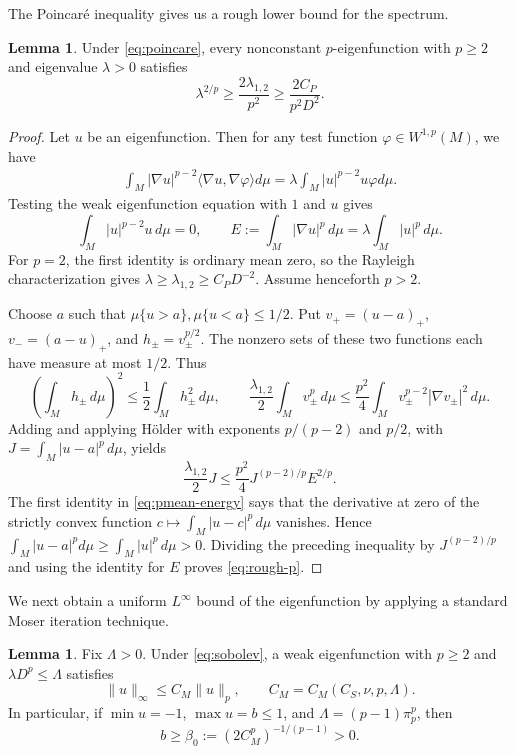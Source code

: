 \documentclass[11pt]{amsart}
\theoremstyle{definition}
\newtheorem{lemma}[theorem]{Lemma}
\begin{document}
The Poincar\'e inequality gives us a rough lower bound for the spectrum.
\begin{lemma}
\label{lem:rough-p}
Under \eqref{eq:poincare}, every nonconstant $p$-eigenfunction with
$p\ge2$ and eigenvalue $\lambda>0$ satisfies
\begin{equation}\label{eq:rough-p}
 \lambda^{2/p}\ge\frac{2\lambda_{1,2}}{p^2}
                  \ge\frac{2C_P}{p^2D^2}.
\end{equation}
\end{lemma}
\begin{proof}
Let $u$ be an eigenfunction.  Then for any test function $\varphi \in W^{1,p}(M)$, we have
\begin{align*}
    \int_M|\nabla u|^{p-2}\langle \nabla u,\nabla \varphi\rangle d\mu=\lambda\int_M|u|^{p-2}u\varphi d\mu.
\end{align*}
Testing the weak eigenfunction equation with $1$ and $u$ gives
\begin{equation}\label{eq:pmean-energy}
 \int_M|u|^{p-2}u\,d\mu=0,\qquad
 E:=\int_M|\nabla u|^p\,d\mu
       =\lambda\int_M|u|^p\,d\mu.
\end{equation}
For $p=2$, the first identity is ordinary mean zero, so the Rayleigh
characterization gives $\lambda\ge\lambda_{1,2}\ge C_PD^{-2}$.
Assume henceforth $p>2$.

Choose $a$ such that
$\mu\{u>a\},\mu\{u<a\}\le1/2$. Put
$v_+=(u-a)_+$, $v_-=(a-u)_+$, and $h_\pm=v_\pm^{p/2}$.
The nonzero sets of these two functions each have measure at most
$1/2$. Thus
\[
 \left(\int_Mh_\pm\,d\mu\right)^2
 \le\frac12\int_Mh_\pm^2\,d\mu,
 \qquad
 \frac{\lambda_{1,2}}2\int_Mv_\pm^p\,d\mu
 \le\frac{p^2}{4}\int_Mv_\pm^{p-2}|\nabla v_\pm|^2\,d\mu.
\]
Adding and applying H\"older with exponents $p/(p-2)$ and $p/2$,
with $J=\int_M|u-a|^p\,d\mu$, yields
\[
 \frac{\lambda_{1,2}}2J
 \le\frac{p^2}{4}J^{(p-2)/p}E^{2/p}.
\]
The first identity in \eqref{eq:pmean-energy} says that the derivative at zero of the
strictly convex function $c\mapsto\int_M|u-c|^p\,d\mu$ vanishes.
Hence $\int_M|u-a|^pd\mu\ge\int_M|u|^p\,d\mu>0$. Dividing the preceding inequality
by $J^{(p-2)/p}$ and using the identity for $E$ proves
\eqref{eq:rough-p}.
\end{proof}
We next obtain a uniform $L^\infty$ bound of the eigenfunction by applying a standard Moser iteration technique.
\begin{lemma}\label{lem:amplitude}
Fix $\Lambda>0$. Under \eqref{eq:sobolev}, a weak eigenfunction
with $p\ge2$ and $\lambda D^p\le\Lambda$ satisfies
\[
 \|u\|_\infty\le C_M\|u\|_p,
 \qquad C_M=C_M(C_S,\nu,p,\Lambda).
\]
In particular, if $\min u=-1$, $\max u=b\le1$, and
$\Lambda=(p-1)\pi^p_p$, then
\begin{equation}\label{eq:amplitude}
 b\ge\beta_0:=(2C_M^p)^{-1/(p-1)}>0.
\end{equation}
\end{lemma}
\end{document}
